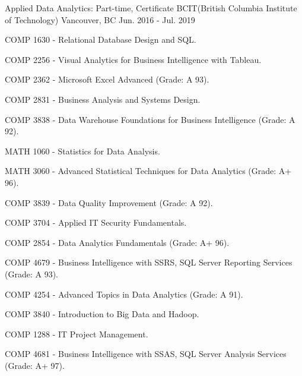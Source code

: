 

\begin{cventries}

  \cventry
    {Applied Data Analytics: Part-time, Certificate} %
    {BCIT(British Columbia Institute of Technology)} %
    {Vancouver, BC} %
    {Jun. 2016 - Jul. 2019} %
    {
      \begin{cvitems} %
        \item {COMP 1630 - Relational Database Design and SQL.}
        \item {COMP 2256 - Visual Analytics for Business Intelligence with Tableau.}
        \item {COMP 2362 - Microsoft Excel Advanced (Grade: A 93).}
        \item {COMP 2831 - Business Analysis and Systems Design.}
        \item {COMP 3838 - Data Warehouse Foundations for Business Intelligence (Grade: A 92).}
        \item {MATH 1060 - Statistics for Data Analysis.}
        \item {MATH 3060 - Advanced Statistical Techniques for Data Analytics (Grade: A+ 96).}
        \item {COMP 3839 - Data Quality Improvement (Grade: A 92).}
        \item {COMP 3704 - Applied IT Security Fundamentals.}
        \item {COMP 2854 - Data Analytics Fundamentals (Grade: A+ 96).}
        \item {COMP 4679 - Business Intelligence with SSRS, SQL Server Reporting Services (Grade: A 93).}
        \item {COMP 4254 - Advanced Topics in Data Analytics (Grade: A 91).}
        \item {COMP 3840 - Introduction to Big Data and Hadoop.}
        \item {COMP 1288 - IT Project Management.}
        \item {COMP 4681 - Business Intelligence with SSAS, SQL Server Analysis Services (Grade: A+ 97).}
      \end{cvitems}
    }

\end{cventries}


